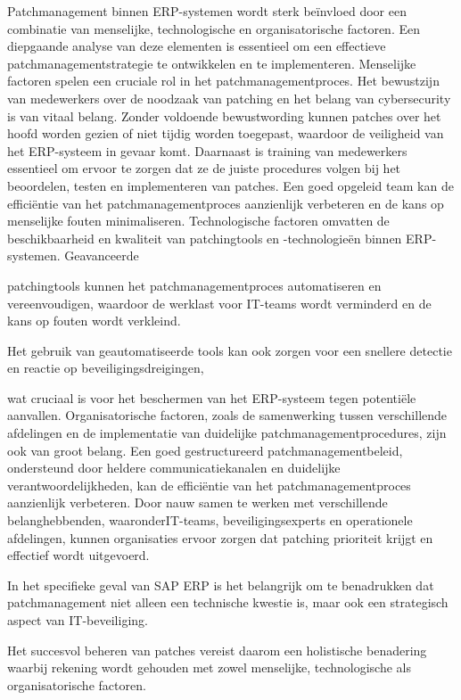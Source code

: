 Patchmanagement binnen ERP-systemen wordt sterk beïnvloed door een combinatie van menselijke, technologische en organisatorische factoren. Een 
diepgaande analyse van deze elementen is essentieel om een effectieve patchmanagementstrategie te ontwikkelen en te implementeren. Menselijke 
factoren spelen een cruciale rol in het patchmanagementproces. Het bewustzijn van medewerkers over de noodzaak van patching en het belang van cybersecurity
is van vitaal belang. Zonder voldoende bewustwording kunnen patches over het hoofd worden gezien of niet tijdig worden toegepast, waardoor de veiligheid van het ERP-systeem in gevaar komt. Daarnaast 
is training van medewerkers essentieel om ervoor te zorgen dat ze de juiste procedures volgen bij het beoordelen, testen en implementeren van patches. 
Een goed opgeleid team kan de efficiëntie van het patchmanagementproces aanzienlijk verbeteren en de kans op menselijke fouten minimaliseren. Technologische 
factoren omvatten de beschikbaarheid en kwaliteit van patchingtools en -technologieën binnen ERP-systemen. Geavanceerde

patchingtools kunnen het patchmanagementproces automatiseren en vereenvoudigen, waardoor de werklast voor IT-teams wordt verminderd en de kans op fouten wordt verkleind. 

Het gebruik van geautomatiseerde tools kan ook zorgen voor een snellere detectie en reactie op beveiligingsdreigingen,

wat cruciaal is voor het beschermen van het ERP-systeem tegen potentiële aanvallen. Organisatorische factoren, zoals 
de samenwerking tussen verschillende afdelingen en de implementatie van duidelijke patchmanagementprocedures, zijn ook van groot belang. Een goed
 gestructureerd patchmanagementbeleid, ondersteund door heldere communicatiekanalen en duidelijke verantwoordelijkheden, kan de efficiëntie van het patchmanagementproces aanzienlijk verbeteren. Door nauw
  samen te werken met verschillende belanghebbenden, waaronderIT-teams, beveiligingsexperts en operationele afdelingen, kunnen organisaties ervoor zorgen dat patching prioriteit krijgt en effectief wordt uitgevoerd.


In het specifieke geval van SAP ERP is het belangrijk om te benadrukken dat patchmanagement niet alleen een technische kwestie is, maar ook een strategisch aspect van IT-beveiliging.

Het succesvol beheren van patches vereist daarom een holistische benadering waarbij rekening wordt gehouden met zowel menselijke, technologische als organisatorische factoren.

